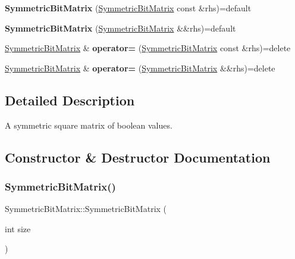 \begin{DoxyCompactItemize}
{\bfseries Symmetric\+Bit\+Matrix} (\hyperlink{class_symmetric_bit_matrix}{Symmetric\+Bit\+Matrix} const \&rhs)=default
\item 
\mbox{\label{class_symmetric_bit_matrix_ad2ae57483fbfcd2f9f25adce74113984}} 
{\bfseries Symmetric\+Bit\+Matrix} (\hyperlink{class_symmetric_bit_matrix}{Symmetric\+Bit\+Matrix} \&\&rhs)=default
\item 
\mbox{\label{class_symmetric_bit_matrix_ae99a5e93be79299d6e19cb676202423a}} 
\hyperlink{class_symmetric_bit_matrix}{Symmetric\+Bit\+Matrix} \& {\bfseries operator=} (\hyperlink{class_symmetric_bit_matrix}{Symmetric\+Bit\+Matrix} const \&rhs)=delete
\item 
\mbox{\label{class_symmetric_bit_matrix_a10f01bb01e7254d487c7d5cc98740d70}} 
\hyperlink{class_symmetric_bit_matrix}{Symmetric\+Bit\+Matrix} \& {\bfseries operator=} (\hyperlink{class_symmetric_bit_matrix}{Symmetric\+Bit\+Matrix} \&\&rhs)=delete
\end{DoxyCompactItemize}


\subsection{Detailed Description}
A symmetric square matrix of boolean values. 

\subsection{Constructor \& Destructor Documentation}
\mbox{\label{class_symmetric_bit_matrix_a828dbcd597cd13390922d863357da3f3}} 
\subsubsection{\texorpdfstring{Symmetric\+Bit\+Matrix()}{SymmetricBitMatrix()}}
{\footnotesize\ttfamily Symmetric\+Bit\+Matrix\+::\+Symmetric\+Bit\+Matrix (\begin{DoxyParamCaption}\item[{int}]{size }\end{DoxyParamCaption})\hspace{0.3cm}{\ttfamily [inline]}}



